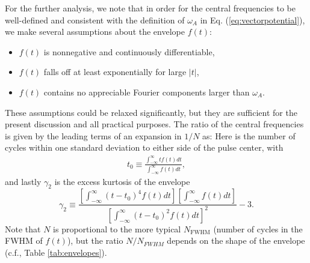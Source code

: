 For the further analysis, we note that in order for the central frequencies to be well-defined and consistent with the definition of $\omega_A$ in Eq. (\ref{eq:vectorpotential}), we make several assumptions about the envelope $f(t)$:
\begin{itemize}
  \item $f(t)$ is nonnegative and continuously differentiable,
  \item $f(t)$ falls off at least exponentially for large $|t|$, 
\item $f(t)$ contains no appreciable Fourier components larger than $\omega_A$.
\end{itemize}
These assumptions could be relaxed significantly, but they are sufficient for the present discussion and all practical purposes. The ratio of the central frequencies is given by the leading terms of an expansion in $1/N$ as:
%
Here
%
%
is the number of cycles within one standard deviation to either side of the pulse center, with
%
\begin{equation}
\begin{split}
t_0 \equiv \frac{\int_{-\infty}^{\infty} t f(t) dt}{\int_{-\infty}^{\infty} f(t) dt},
\end{split}
\end{equation}
%
and lastly $\gamma_2$ is the excess kurtosis of the envelope
%
\begin{equation}
\label{eq:gamma2}
\gamma_2 \equiv \frac{\left[\int_{-\infty}^{\infty} (t-t_0)^4 f(t) dt\right]\left[\int_{-\infty}^{\infty} f(t) dt\right]}{\left[\int_{-\infty}^{\infty} (t-t_0)^2 f(t) dt\right]^2}-3.
\end{equation}
%
Note that $N$ is proportional to the more typical $N_{\text{FWHM}}$ (number of cycles in the FWHM of $f(t)$), but the ratio $N/N_{FWHM}$ depends on the shape of the envelope (c.f., Table \ref{tab:envelopes}). 

